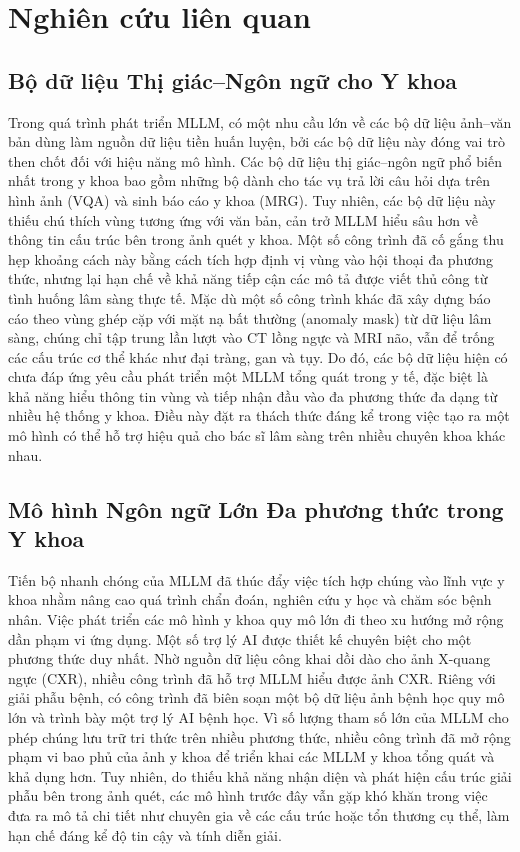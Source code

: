 \documentclass[12pt,a4paper,oneside]{extarticle}
\begin{document}
\section{Nghiên cứu liên quan}

\subsection{Bộ dữ liệu Thị giác--Ngôn ngữ cho Y khoa}

Trong quá trình phát triển MLLM, có một nhu cầu lớn về các bộ dữ liệu ảnh--văn bản dùng làm
nguồn dữ liệu tiền huấn luyện, bởi các bộ dữ liệu này đóng vai trò then chốt đối với hiệu năng
mô hình. Các bộ dữ liệu thị giác--ngôn ngữ phổ biến nhất trong y khoa bao gồm những bộ dành cho
tác vụ trả lời câu hỏi dựa trên hình ảnh (VQA) và sinh báo cáo y khoa (MRG). Tuy nhiên, các bộ
dữ liệu này thiếu chú thích vùng tương ứng với văn bản, cản trở MLLM hiểu sâu hơn về thông tin
cấu trúc bên trong ảnh quét y khoa. Một số công trình đã cố gắng thu hẹp khoảng cách này bằng
cách tích hợp định vị vùng vào hội thoại đa phương thức, nhưng lại hạn chế về khả năng tiếp cận
các mô tả được viết thủ công từ tình huống lâm sàng thực tế. Mặc dù một số công trình khác đã
xây dựng báo cáo theo vùng ghép cặp với mặt nạ bất thường (anomaly mask) từ dữ liệu lâm sàng,
chúng chỉ tập trung lần lượt vào CT lồng ngực và MRI não, vẫn để trống các cấu trúc cơ thể khác
như đại tràng, gan và tụy. Do đó, các bộ dữ liệu hiện có chưa đáp ứng yêu cầu phát triển một
MLLM tổng quát trong y tế, đặc biệt là khả năng hiểu thông tin vùng và tiếp nhận đầu vào đa
phương thức đa dạng từ nhiều hệ thống y khoa. Điều này đặt ra thách thức đáng kể trong việc
tạo ra một mô hình có thể hỗ trợ hiệu quả cho bác sĩ lâm sàng trên nhiều chuyên khoa khác nhau.

\subsection{Mô hình Ngôn ngữ Lớn Đa phương thức trong Y khoa}

Tiến bộ nhanh chóng của MLLM đã thúc đẩy việc tích hợp chúng vào lĩnh vực y khoa nhằm nâng cao
quá trình chẩn đoán, nghiên cứu y học và chăm sóc bệnh nhân. Việc phát triển các mô hình y khoa
quy mô lớn đi theo xu hướng mở rộng dần phạm vi ứng dụng. Một số trợ lý AI được thiết kế chuyên
biệt cho một phương thức duy nhất. Nhờ nguồn dữ liệu công khai dồi dào cho ảnh X-quang ngực
(CXR), nhiều công trình đã hỗ trợ MLLM hiểu được ảnh CXR. Riêng với giải phẫu bệnh, có công
trình đã biên soạn một bộ dữ liệu ảnh bệnh học quy mô lớn và trình bày một trợ lý AI bệnh học.
Vì số lượng tham số lớn của MLLM cho phép chúng lưu trữ tri thức trên nhiều phương thức, nhiều
công trình đã mở rộng phạm vi bao phủ của ảnh y khoa để triển khai các MLLM y khoa tổng quát và
khả dụng hơn. Tuy nhiên, do thiếu khả năng nhận diện và phát hiện cấu trúc giải phẫu bên trong
ảnh quét, các mô hình trước đây vẫn gặp khó khăn trong việc đưa ra mô tả chi tiết như chuyên gia
về các cấu trúc hoặc tổn thương cụ thể, làm hạn chế đáng kể độ tin cậy và tính diễn giải.
\end{document}
